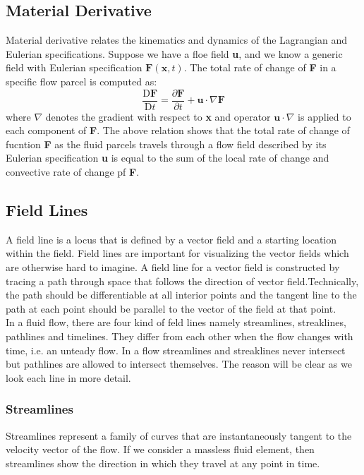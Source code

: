 \subsection{Material Derivative}
Material derivative relates the kinematics and dynamics of the Lagrangian and Eulerian specifications. Suppose we have a floe field \textbf{u}, and we know a generic field with Eulerian specification $\textbf{F}(\textbf{x},t)$. The total rate of change of \textbf{F} in a specific flow parcel is computed as:
\begin{equation}
	\frac{\text{D}\textbf{F}}{\text{D}t} = \frac{\partial \textbf{F}}{\partial t}+ \textbf{u} \cdot \nabla \textbf{F}
\end{equation}
where $ \nabla $ denotes the gradient with respect to \textbf{x} and operator $\textbf{u}\cdot \nabla$ is applied to each component of \textbf{F}. The above relation shows that the total rate of change of fucntion \textbf{F} as the fluid parcels travels through a flow field described by its Eulerian specification \textbf{u} is equal to the sum of the local rate of change and convective rate of change pf \textbf{F}.

\subsection{Field Lines}
A field line is a locus that is defined by a vector field and a starting location within the field. Field lines are important for visualizing the vector fields which are otherwise hard to imagine. A field line for a vector field is constructed by tracing a path through space that follows the direction of vector field.Technically, the path should be differentiable at all interior points and the tangent line to the path at each point should be parallel to the vector of the field at that point.
\\
In a fluid flow, there are four kind of feld lines namely streamlines, streaklines, pathlines and timelines. They differ from each other when the flow changes with time, i.e. an unteady flow. In a flow streamlines and streaklines never intersect but pathlines are allowed to intersect themselves. The reason will be clear as we look each line in more detail.

\subsubsection{Streamlines}
Streamlines represent a family of curves that are instantaneously tangent to the velocity vector of the flow. If we consider a massless fluid element, then streamlines show the direction in which they travel at any point in time.

